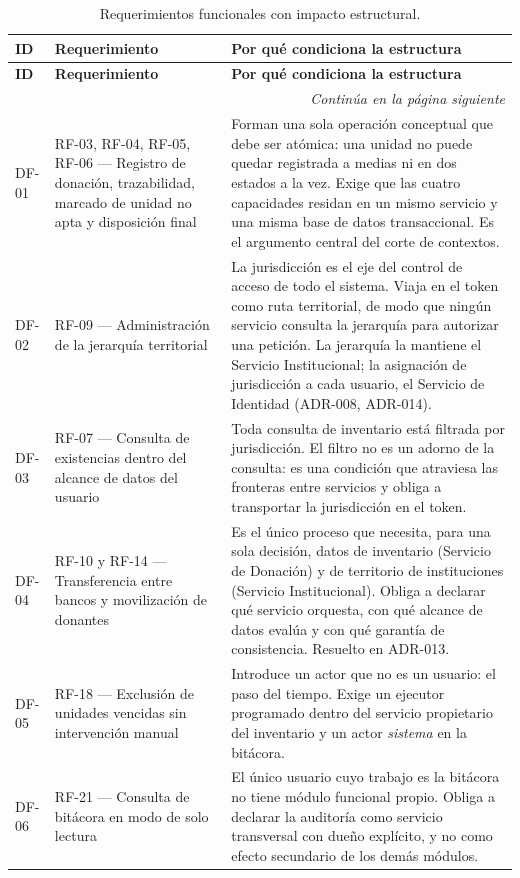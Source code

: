 \documentclass[11pt,a4paper]{article}
\newcommand{\contlinea}[1]{\multicolumn{#1}{r}{\footnotesize\itshape Continúa en la página siguiente}}
\begin{document}
\begin{longtable}{L{1.5cm} L{5.0cm} L{8.0cm}}
\caption{Requerimientos funcionales con impacto estructural.}\label{tab:driversfun}\\
\toprule
\textbf{ID} & \textbf{Requerimiento} & \textbf{Por qué condiciona la estructura} \\
\midrule
\endfirsthead
\toprule
\textbf{ID} & \textbf{Requerimiento} & \textbf{Por qué condiciona la estructura} \\
\midrule
\endhead
\midrule
\contlinea{3} \\
\endfoot
\bottomrule
\endlastfoot
DF-01 & RF-03, RF-04, RF-05, RF-06 --- Registro de donación, trazabilidad, marcado de unidad no apta y disposición final & Forman una sola operación conceptual que debe ser atómica: una unidad no puede quedar registrada a medias ni en dos estados a la vez. Exige que las cuatro capacidades residan en un mismo servicio y una misma base de datos transaccional. Es el argumento central del corte de contextos. \\
DF-02 & RF-09 --- Administración de la jerarquía territorial & La jurisdicción es el eje del control de acceso de todo el sistema. Viaja en el token como ruta territorial, de modo que ningún servicio consulta la jerarquía para autorizar una petición. La jerarquía la mantiene el Servicio Institucional; la asignación de jurisdicción a cada usuario, el Servicio de Identidad (ADR-008, ADR-014). \\
DF-03 & RF-07 --- Consulta de existencias dentro del alcance de datos del usuario & Toda consulta de inventario está filtrada por jurisdicción. El filtro no es un adorno de la consulta: es una condición que atraviesa las fronteras entre servicios y obliga a transportar la jurisdicción en el token. \\
DF-04 & RF-10 y RF-14 --- Transferencia entre bancos y movilización de donantes & Es el único proceso que necesita, para una sola decisión, datos de inventario (Servicio de Donación) y de territorio de instituciones (Servicio Institucional). Obliga a declarar qué servicio orquesta, con qué alcance de datos evalúa y con qué garantía de consistencia. Resuelto en ADR-013. \\
DF-05 & RF-18 --- Exclusión de unidades vencidas sin intervención manual & Introduce un actor que no es un usuario: el paso del tiempo. Exige un ejecutor programado dentro del servicio propietario del inventario y un actor \emph{sistema} en la bitácora. \\
DF-06 & RF-21 --- Consulta de bitácora en modo de solo lectura & El único usuario cuyo trabajo es la bitácora no tiene módulo funcional propio. Obliga a declarar la auditoría como servicio transversal con dueño explícito, y no como efecto secundario de los demás módulos. \\
\end{longtable}
\end{document}
